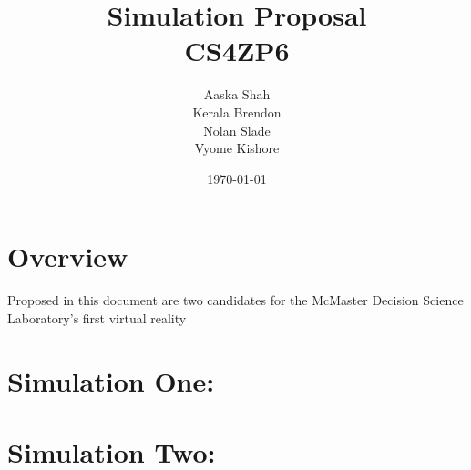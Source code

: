 \documentclass{article}
\title{\textbf{Simulation Proposal}\\CS4ZP6}
\author{Aaska Shah\\Kerala Brendon\\Nolan Slade\\Vyome Kishore}
\date{\today}
\begin{document}
\maketitle

\section*{Overview}

Proposed in this document are two candidates for the McMaster Decision Science Laboratory's first virtual reality 

\section*{Simulation One: }

\section*{Simulation Two: }
\end{document}

